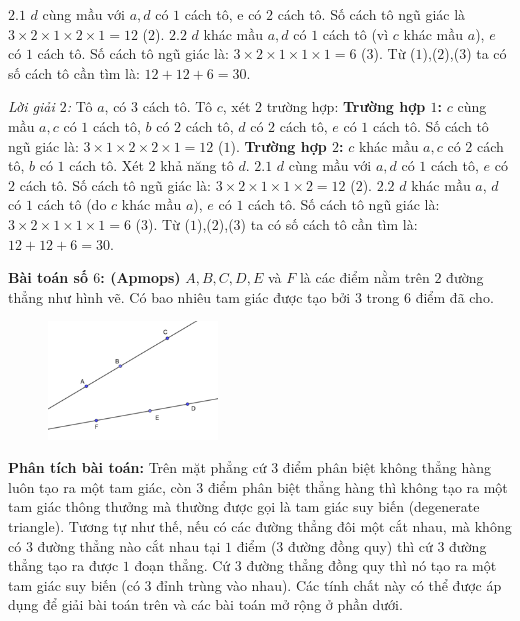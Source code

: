 \begin{multicols}{2}
\begin{multicols}{2}
		\vskip 0.1cm
		$2.1$ $d$ cùng mầu với $a, d$ có $1$ cách tô, e có $2$ cách tô. Số cách tô ngũ giác là $3\times2\times1\times2\times1=12$ ($2$).
		\vskip 0.1cm
		$2.2$ $d$ khác mầu $a, d$ có $1$ cách tô (vì $c$ khác mầu $a$), $e$ có $1$ cách tô. Số cách tô ngũ giác là: $3\times2\times1\times1\times1=6$ ($3$).
		\vskip 0.1cm
		Từ ($1$),($2$),($3$) ta có số cách tô cần tìm là: $12+12+6=30$.
	\end{multicols}
	\textit{Lời giải $2$:}
	\vskip 0.1cm
	Tô $a$, có $3$ cách tô. Tô $c$, xét $2$ trường hợp:
	\vskip 0.1cm
	\textbf{Trường hợp $1$:} $c$ cùng mầu $a, c$ có $1$ cách tô, $b$ có $2$ cách tô, $d$ có $2$ cách tô, $e$ có $1$ cách tô. Số cách tô ngũ giác là: $3\times1\times2\times2\times1=12$ ($1$).
	\vskip 0.1cm
	\textbf{Trường hợp $2$:} $c$ khác mầu $a, c$ có $2$ cách tô, $b$ có $1$ cách tô. Xét $2$ khả năng tô $d$.
	\vskip 0.1cm
	$2.1$ $d$ cùng mầu với $a, d$ có $1$ cách tô, $e$ có $2$ cách tô. Số cách tô ngũ giác là: $3\times2\times1\times1\times2=12$ ($2$).
	\vskip 0.1cm
	$2.2$ $d$ khác mầu $a$, $d$ có $1$ cách tô (do $c$ khác mầu $a$), $e$ có $1$ cách tô. Số cách tô ngũ giác là: $3\times2\times1\times1\times1=6$ ($3$).
	\vskip 0.1cm
	Từ ($1$),($2$),($3$) ta có số cách tô cần tìm là: $12+12+6=30$.
	\vskip 0.1cm
	\begin{multicols}{2}
		\textbf{Bài toán số $6$: (Apmops)}
		\vskip 0.1cm
		$A,B,C,D,E$ và $F$ là các điểm nằm trên $2$ đường thẳng như hình vẽ. Có bao nhiêu tam giác được tạo bởi $3$ trong $6$ điểm đã cho.
		\begin{figure}[H]
			\centering
			\vspace*{-5pt}
			\captionsetup{labelformat=empty, justification=centering}
			\includegraphics[width=0.4\textwidth]{_9}
			\vspace*{-15pt}
		\end{figure}
	\end{multicols}
	\textbf{Phân tích bài toán:}
	\vskip 0.1cm
	Trên mặt phẳng cứ $3$ điểm phân biệt không thẳng hàng luôn tạo ra một tam giác, còn $3$ điểm phân biệt thẳng hàng thì không tạo ra một tam giác thông thưởng mà thường được gọi là tam giác suy biến (degenerate triangle). Tương tự như thế, nếu có các đường thẳng đôi một cắt nhau, mà không có $3$ đường thẳng nào cắt nhau tại $1$ điểm ($3$ đường đồng quy) thì cứ $3$ đường thẳng tạo ra được $1$ đoạn thẳng. Cứ $3$ đường thẳng đồng quy thì nó tạo ra một tam giác suy biến (có $3$ đỉnh trùng vào nhau). Các tính chất này có thể được áp dụng để giải bài toán trên và các bài toán mở rộng ở phần dưới.

\end{multicols}
